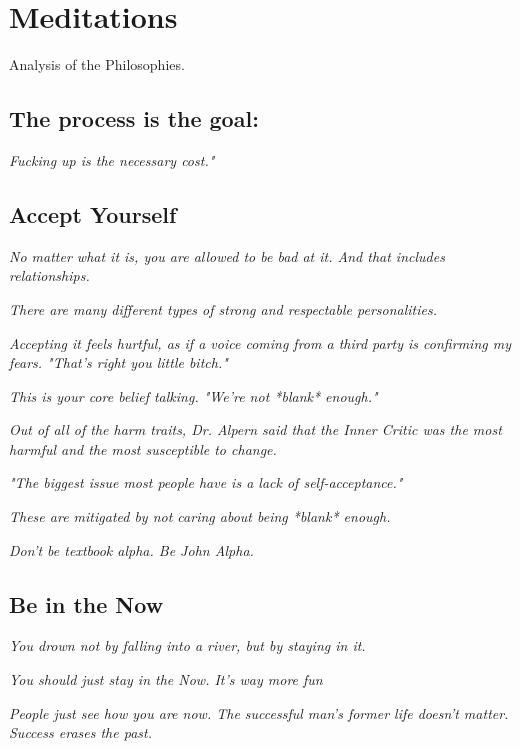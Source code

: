 \documentclass[12pt]{article}
\begin{document}
\pagebreak


\section*{Meditations}

Analysis of the Philosophies.  

\subsection*{The process is the goal:}
\textit{Fucking up is the necessary cost."}

\pagebreak

\subsection*{Accept Yourself}

\textit{No matter what it is, you are allowed to be bad at it.  And that includes relationships.}

\textit{There are many different types of strong and respectable personalities.}

\textit{Accepting it feels hurtful, as if a voice coming from a third party is confirming my fears.  "That's right you little bitch."}

\textit{This is your core belief talking.  "We're not *blank* enough."}

\textit{Out of all of the harm traits, Dr. Alpern said that the Inner Critic was the most harmful and the most susceptible to change.}

\textit{"The biggest issue most people have is a lack of self-acceptance."}

\textit{These are mitigated by not caring about being *blank* enough.}

\textit{Don't be textbook alpha.  Be John Alpha.}

\pagebreak




\subsection*{Be in the Now}

\textit{You drown not by falling into a river, but by staying in it.}

\textit{You should just stay in the Now.  It's way more fun}

\textit{People just see how you are now.  The successful man's former life doesn't matter.  Success erases the past.}
\end{document}
